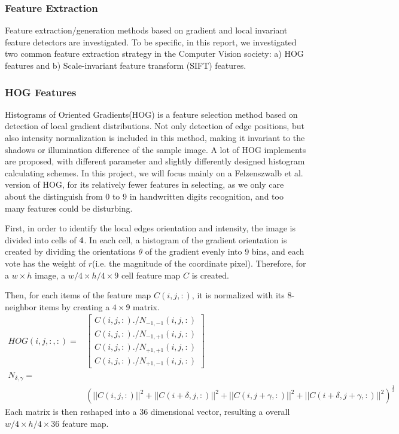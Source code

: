\documentclass[12pt]{article}
\begin{document}
\subsubsection{Feature Extraction}
Feature extraction/generation methods based on gradient and local invariant feature detectors are investigated. To be specific, in this report, we investigated two common feature extraction strategy in the Computer Vision society: a) HOG features and b) Scale-invariant feature transform (SIFT) features.

\subsubsection*{HOG Features}
 Histograms of Oriented Gradients(HOG)\cite{dalal2005histograms}\cite{felzenszwalb2010object} is a feature selection method based on detection of local gradient distributions. Not only detection of edge positions, but also intensity normalization is included in this method, making it invariant to the shadows or illumination difference of the sample image. A lot of HOG implements are proposed, with different parameter and slightly differently designed histogram calculating schemes. In this project, we will focus mainly on a Felzenszwalb et al. version\cite{felzenszwalb2010object}  of HOG, for its relatively fewer features in selecting, as we only care about the distinguish from 0 to 9 in handwritten digits recognition, and too many features could be disturbing.

First, in order to identify the local edges orientation and intensity, the image is divided into cells of $4\time4$. In each cell, a histogram of the gradient orientation is created by dividing the orientations $\theta$ of the gradient evenly into 9 bins, and each vote has the weight of $r$(i.e. the magnitude of the coordinate pixel). Therefore, for a $ w\times h$ image,  a $w/4 \times h/4 \times 9$ cell feature map $C$ is created. 

Then, for each items of the feature map $C(i,j,:)$, it is normalized with its 8-neighbor items by creating a $4\times 9$ matrix.
\begin{equation}
\begin{aligned}
HOG(i,j,:,:) =&  \left[\begin{array}{c}
C(i,j,:)./N_{-1,-1}(i,j,:)\\
C(i,j,:)./N_{-1,+1}(i,j,:)\\
C(i,j,:)./N_{+1,+1}(i,j,:)\\
C(i,j,:)./N_{+1,-1}(i,j,:)\end{array}\right]\\
 N_{\delta,\gamma} =&\\
 & (||C(i,j,:)||^2+||C(i+\delta,j,:)||^2+||C(i,j+\gamma,:)||^2+||C(i+\delta,j+\gamma,:)||^2)^{\frac{1}{2}}
\end{aligned}
\end{equation}\cite{felzenszwalb2010object}
Each matrix is then reshaped into a 36 dimensional vector, resulting a overall $ w/4 \times h/4 \times 36$ feature map.
\end{document}
